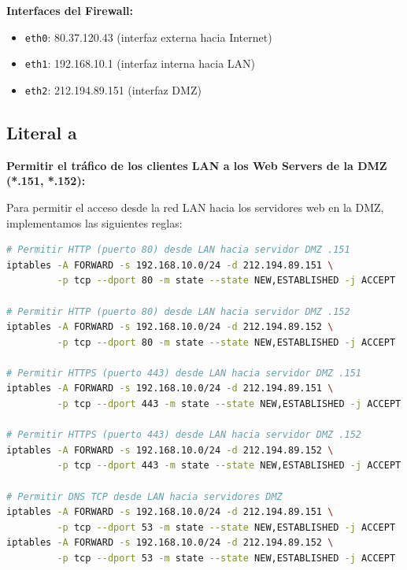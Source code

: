 {\textbf{Interfaces del Firewall:}
\begin{itemize}
    \item \texttt{eth0}: 80.37.120.43 (interfaz externa hacia Internet)
    \item \texttt{eth1}: 192.168.10.1 (interfaz interna hacia LAN)
    \item \texttt{eth2}: 212.194.89.151 (interfaz DMZ)
\end{itemize}



\subsection{Literal a}

\textbf{Permitir el tráfico de los clientes LAN a los Web Servers de la DMZ (*.151, *.152):}


Para permitir el acceso desde la red LAN hacia los servidores web en la DMZ, implementamos las siguientes reglas:

\begin{lstlisting}[language=bash, caption=Reglas para tráfico LAN hacia DMZ]
# Permitir HTTP (puerto 80) desde LAN hacia servidor DMZ .151
iptables -A FORWARD -s 192.168.10.0/24 -d 212.194.89.151 \
         -p tcp --dport 80 -m state --state NEW,ESTABLISHED -j ACCEPT

# Permitir HTTP (puerto 80) desde LAN hacia servidor DMZ .152
iptables -A FORWARD -s 192.168.10.0/24 -d 212.194.89.152 \
         -p tcp --dport 80 -m state --state NEW,ESTABLISHED -j ACCEPT

# Permitir HTTPS (puerto 443) desde LAN hacia servidor DMZ .151
iptables -A FORWARD -s 192.168.10.0/24 -d 212.194.89.151 \
         -p tcp --dport 443 -m state --state NEW,ESTABLISHED -j ACCEPT

# Permitir HTTPS (puerto 443) desde LAN hacia servidor DMZ .152
iptables -A FORWARD -s 192.168.10.0/24 -d 212.194.89.152 \
         -p tcp --dport 443 -m state --state NEW,ESTABLISHED -j ACCEPT

# Permitir DNS TCP desde LAN hacia servidores DMZ
iptables -A FORWARD -s 192.168.10.0/24 -d 212.194.89.151 \
         -p tcp --dport 53 -m state --state NEW,ESTABLISHED -j ACCEPT
iptables -A FORWARD -s 192.168.10.0/24 -d 212.194.89.152 \
         -p tcp --dport 53 -m state --state NEW,ESTABLISHED -j ACCEPT


\end{lstlisting}}
